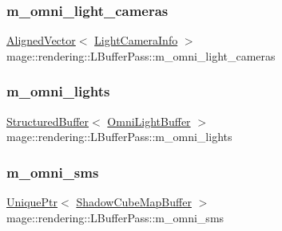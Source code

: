 \subsubsection{\texorpdfstring{m\+\_\+omni\+\_\+light\+\_\+cameras}{m\_omni\_light\_cameras}}
{\footnotesize\ttfamily \mbox{\hyperlink{namespacemage_a8664bfb5ce2179fc64eae9f82c8a5ba8}{Aligned\+Vector}}$<$ \mbox{\hyperlink{structmage_1_1rendering_1_1_l_buffer_pass_1_1_light_camera_info}{Light\+Camera\+Info}} $>$ mage\+::rendering\+::\+L\+Buffer\+Pass\+::m\+\_\+omni\+\_\+light\+\_\+cameras\hspace{0.3cm}{\ttfamily [private]}}

\mbox{\label{classmage_1_1rendering_1_1_l_buffer_pass_af7bc4d8ed4d667aa8e6375d6f243d900}} 
\subsubsection{\texorpdfstring{m\+\_\+omni\+\_\+lights}{m\_omni\_lights}}
{\footnotesize\ttfamily \mbox{\hyperlink{classmage_1_1rendering_1_1_structured_buffer}{Structured\+Buffer}}$<$ \mbox{\hyperlink{structmage_1_1rendering_1_1_omni_light_buffer}{Omni\+Light\+Buffer}} $>$ mage\+::rendering\+::\+L\+Buffer\+Pass\+::m\+\_\+omni\+\_\+lights\hspace{0.3cm}{\ttfamily [private]}}

\mbox{\label{classmage_1_1rendering_1_1_l_buffer_pass_acd46b497a33a96553fa804cb3ebee8ec}} 
\subsubsection{\texorpdfstring{m\+\_\+omni\+\_\+sms}{m\_omni\_sms}}
{\footnotesize\ttfamily \mbox{\hyperlink{namespacemage_a3316d7143a973e37adf1110f2e80ca31}{Unique\+Ptr}}$<$ \mbox{\hyperlink{classmage_1_1rendering_1_1_shadow_cube_map_buffer}{Shadow\+Cube\+Map\+Buffer}} $>$ mage\+::rendering\+::\+L\+Buffer\+Pass\+::m\+\_\+omni\+\_\+sms\hspace{0.3cm}{\ttfamily [private]}}


